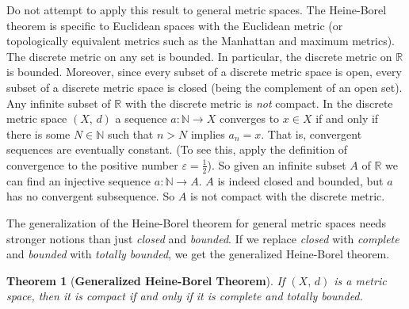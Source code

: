 \documentclass{article}
\theoremstyle{plain}
\newtheorem{theorem}{Theorem}[section]
\theoremstyle{normal}
\begin{document}
        Do not attempt to apply this result to general metric spaces. The
        Heine-Borel theorem is specific to Euclidean spaces with the Euclidean
        metric (or topologically equivalent metrics such as the Manhattan and
        maximum metrics). The discrete metric on any set is bounded. In
        particular, the discrete metric on $\mathbb{R}$ is bounded. Moreover,
        since every subset of a discrete metric space is open, every subset of
        a discrete metric space is closed (being the complement of an open set).
        Any infinite subset of $\mathbb{R}$ with the discrete metric is
        \textit{not} compact. In the discrete metric space $(X,\,d)$ a sequence
        $a:\mathbb{N}\rightarrow{X}$ converges to $x\in{X}$ if and only if
        there is some $N\in\mathbb{N}$ such that $n>N$ implies
        $a_{n}=x$. That is, convergent sequences are eventually constant.
        (To see this, apply the definition of convergence to the positive
        number $\varepsilon=\frac{1}{2}$). So given an infinite subset $A$ of
        $\mathbb{R}$ we can find an injective sequence
        $a:\mathbb{N}\rightarrow{A}$. $A$ is indeed closed and bounded, but
        $a$ has no convergent subsequence. So $A$ is not compact with the
        discrete metric.
        \par\hfill\par
        The generalization of the Heine-Borel theorem for general metric spaces
        needs stronger notions than just \textit{closed} and \textit{bounded}.
        If we replace \textit{closed} with \textit{complete} and
        \textit{bounded} with \textit{totally bounded}, we get the
        generalized Heine-Borel theorem.
        \begin{theorem}[\textbf{Generalized Heine-Borel Theorem}]
            If $(X,\,d)$ is a metric space, then it is compact if and only
            if it is complete and totally bounded.
        \end{theorem}
\end{document}
